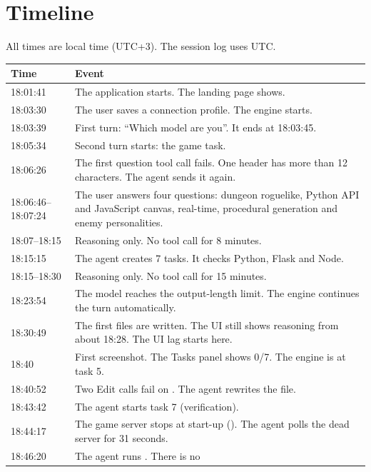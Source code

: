 \documentclass[11pt,a4paper]{article}
\newcommand{\code}[1]{\texttt{\detokenize{#1}}}
\begin{document}
\section{Timeline}

All times are local time (UTC+3). The session log uses UTC.

\begin{longtable}{@{}p{2.3cm}p{12.7cm}@{}}
\toprule
Time & Event \\
\midrule
\endhead
18:01:41 & The application starts. The landing page shows. \\
18:03:30 & The user saves a connection profile. The engine starts. \\
18:03:39 & First turn: ``Which model are you''. It ends at 18:03:45. \\
18:05:34 & Second turn starts: the game task. \\
18:06:26 & The first question tool call fails. One header has more than 12
           characters. The agent sends it again. \\
18:06:46--18:07:24 & The user answers four questions: dungeon roguelike, Python
           API and JavaScript canvas, real-time, procedural generation and enemy
           personalities. \\
18:07--18:15 & Reasoning only. No tool call for 8 minutes. \\
18:15:15 & The agent creates 7 tasks. It checks Python, Flask and Node. \\
18:15--18:30 & Reasoning only. No tool call for 15 minutes. \\
18:23:54 & The model reaches the output-length limit. The engine continues the
           turn automatically. \\
18:30:49 & The first files are written. The UI still shows reasoning from about
           18:28. The UI lag starts here. \\
18:40 & First screenshot. The Tasks panel shows 0/7. The engine is at task 5. \\
18:40:52 & Two Edit calls fail on \code{RunServer.py}. The agent rewrites the
           file. \\
18:43:42 & The agent starts task 7 (verification). \\
18:44:17 & The game server stops at start-up (\code{TypeError}). The agent
           polls the dead server for 31 seconds. \\
18:46:20 & The agent runs \code{taskkill //F //IM python.exe}. There is no

\end{longtable}
\end{document}
